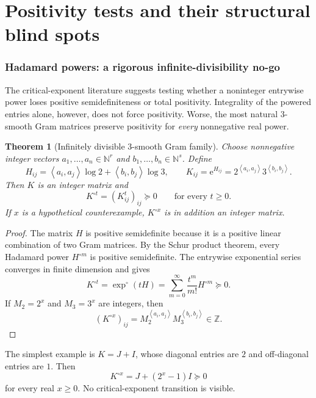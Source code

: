 \documentclass[11pt,oneside]{article}
\newtheorem{theorem}{Theorem}[section]
\theoremstyle{definition}
\theoremstyle{remark}
\newcommand{\Mtwo}{M_2}
\newcommand{\Mthree}{M_3}
\newcommand{\Z}{\mathbb{Z}}
\newcommand{\N}{\mathbb{N}}
\newcommand{\inner}[2]{\left\langle #1,#2\right\rangle}
\newcommand{\e}{\mathrm{e}}
\begin{document}
\part{Positivity tests and their structural blind spots}

\section{Hadamard powers: a rigorous infinite-divisibility no-go}
\label{sec:hadamard}

The critical-exponent literature suggests testing whether a noninteger entrywise power loses positive semidefiniteness or total positivity.  Integrality of the powered entries alone, however, does not force positivity.  Worse, the most natural $3$-smooth Gram matrices preserve positivity for \emph{every} nonnegative real power.

\begin{theorem}[Infinitely divisible $3$-smooth Gram family]
\label{thm:infinite-divisible}
Choose nonnegative integer vectors $a_1,\dots,a_n\in\N^r$ and
$b_1,\dots,b_n\in\N^s$.  Define
\begin{equation}
 H_{ij}=\inner{a_i}{a_j}\log2+\inner{b_i}{b_j}\log3,
 \qquad
 K_{ij}=\e^{H_{ij}}
 =2^{\inner{a_i}{a_j}}3^{\inner{b_i}{b_j}}.
 \label{eq:smooth-Gram}
\end{equation}
Then $K$ is an integer matrix and
\begin{equation}
 K^{\circ t}=(K_{ij}^t)_{ij}\succeq0
 \qquad\text{for every }t\ge0.
 \label{eq:all-powers-PSD}
\end{equation}
If $x$ is a hypothetical counterexample, $K^{\circ x}$ is in addition an integer matrix.
\end{theorem}

\begin{proof}
The matrix $H$ is positive semidefinite because it is a positive linear combination of two Gram matrices.  By the Schur product theorem, every Hadamard power $H^{\circ m}$ is positive semidefinite.  The entrywise exponential series converges in finite dimension and gives
\[
 K^{\circ t}=\exp^{\circ}(tH)
 =\sum_{m=0}^\infty\frac{t^m}{m!}H^{\circ m}\succeq0.
\]
If $\Mtwo=2^x$ and $\Mthree=3^x$ are integers, then
\[
 (K^{\circ x})_{ij}
 =\Mtwo^{\inner{a_i}{a_j}}\Mthree^{\inner{b_i}{b_j}}\in\Z.
\]
\end{proof}

The simplest example is $K=J+I$, whose diagonal entries are $2$ and off-diagonal entries are $1$.  Then
\[
 K^{\circ x}=J+(2^x-1)I\succeq0
\]
for every real $x\ge0$.  No critical-exponent transition is visible.
\end{document}
